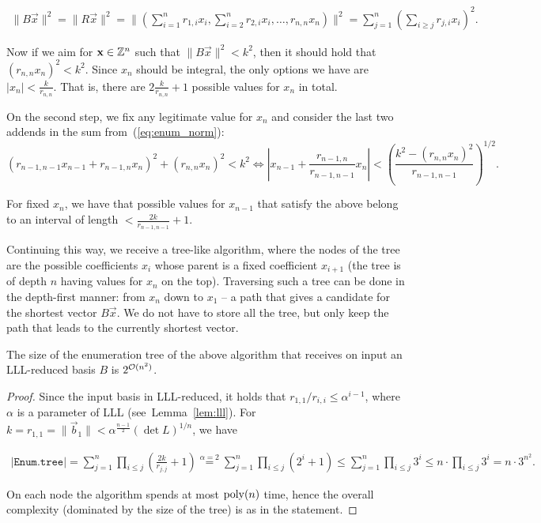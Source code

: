 \begin{align}\label{eq:enum_norm}
	\| B\vec x\|^2  = \| R\vec x\|^2 = \| \left( \sum_{i=1}^n r_{1,i}x_i, \sum_{i=2}^n r_{2,i}x_i, \ldots, r_{n,n} x_n \right) \|^2 = \sum_{j=1}^n \left( \sum_{i \geq j} r_{j,i} x_i \right)^2.
\end{align}

Now if we aim for $\mathbf x \in \mathbb{Z}^n$ such that $\| B \vec x\|^2 < k^2$, then it should hold that $(r_{n,n} x_n)^2 < k^2$. Since $x_n$ should be integral, the only options we have are $|x_n| < \frac{k} {r_{n,n}}$. That is, there are $2 \frac{k}{r_{n,n}}+1$ possible values for $x_n$ in total.

On the second step, we fix any legitimate value for $x_n$ and consider the last two addends in the sum from~(\ref{eq:enum_norm}):
\[
(r_{n-1, n-1}x_{n-1} + r_{n-1, n}x_n)^2 + (r_{n,n}x_n)^2 < k^2 \iff \left|{x_{n-1} + \frac{r_{n-1,n}}{r_{n-1,n-1}}x_n }\right| < \left( \frac{k^2-(r_{n,n}x_n )^2}{r_{n-1, n-1}}\right)^{1/2}.
\]

For fixed $x_{n}$, we have that possible values for $x_{n-1}$ that satisfy the above belong to an interval of length $< \frac{2k}{r_{n-1, n-1}}+1$.

Continuing this way, we receive a tree-like algorithm, where the nodes of the tree are the possible coefficients $x_{i}$ whose parent is a fixed coefficient $x_{i+1}$ (the tree is of depth $n$ having values for $x_n$ on the top). Traversing such a tree can be done in the depth-first manner: from $x_n$ down to $x_1$ -- a path that gives a candidate for the shortest vector $B\vec x$. We do not have to store all the tree, but only keep the path that leads to the currently shortest vector.

\begin{lemma} The size of the enumeration tree of the above algorithm that receives on input an LLL-reduced basis $B$	is $2^{\mathcal{O}(n^2)}$. 
\end{lemma}

\begin{proof}
	Since the input basis in LLL-reduced, it holds that $r_{1,1}/r_{i,i} \leq \alpha^{i-1}$, where $\alpha$ is a parameter of LLL (see~Lemma~\ref{lem:lll}). For $k = r_{1,1} = \| \vec b_1 \| < \alpha^{\frac{n-1}{2}} (\det L)^{1/n}$, we have
	
	\begin{align*}
		|\texttt{Enum.tree}| = \sum_{j=1}^n \prod_{i \leq j} \left( \frac{2k}{r_{j,j}} +1 \right) \stackrel{\alpha=2}{=} \sum_{j=1}^n \prod_{i \leq j} (2^i+1)\leq \sum_{j=1}^n \prod_{i \leq j} 3^i \leq n \cdot  \prod_{i \leq j} 3^i = n \cdot 3^{n^2}.
	\end{align*}

On each node the algorithm spends at most $\operatorname{poly}(n)$ time, hence the overall complexity (dominated by the size of the tree) is as in the statement.
\end{proof}

